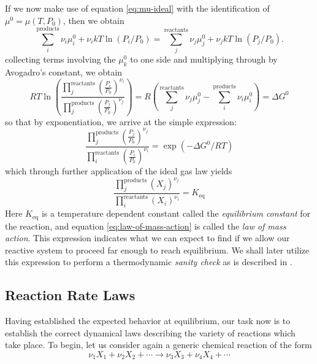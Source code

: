 If we now make use of equation \ref{eq:mu-ideal} with the identification of $\mu^0 = \mu(T,P_0)$, then we obtain
\begin{equation}
  \sum_{i}^{\text{products}}\nu_i\mu_i^0 + \nu_i kT\ln(P_i/P_0) = \sum_{j}^{\text{reactants}} \nu_j\mu_j^0 + \nu_j kT\ln(P_j/P_0).
\end{equation}
collecting terms involving the $\mu^0_k$ to one side and multiplying through by Avogadro's constant, we obtain
\begin{equation}
  RT\ln\left(\frac{\prod\limits_j^{\text{reactants}}\left(\frac{P_i}{P_0}\right)^{\nu_i}}{\prod\limits_j^{\text{products}}\left(\frac{P_j}{P_0}\right)^{\nu_j}}\right) = R\left(\sum_j^{\text{reactants}}\nu_j\mu_j^0 -  \sum_i^{\text{products}} \nu_i\mu_i^0\right) = \Delta G^0
\end{equation}
so that by exponentiation, we arrive at the simple expression:
\begin{equation}
  \frac{\prod\limits_j^{\text{products}}\left(\frac{P_j}{P_0}\right)^{\nu_j}}{\prod\limits_i^{\text{reactants}}\left(\frac{P_i}{P_0}\right)^{\nu_i}} = \exp(-\Delta G^0/RT)
\end{equation}
which through further application of the ideal gas law yields
\begin{equation}
  \label{eq:law-of-mass-action}
  \boxed{\frac{\prod\limits_j^{\text{products}}\left(X_j\right)^{\nu_j}}{\prod\limits_i^{\text{reactants}}\left(X_i\right)^{\nu_i}} = K_{\text{eq}}}
\end{equation}
Here $K_{\text{eq}}$ is a temperature dependent constant called the \textit{equilibrium constant} for the reaction, and equation \ref{eq:law-of-mass-action} is called the \textit{law of mass action}. This expression indicates what we can expect to find if we allow our reactive system to proceed far enough to reach equilibrium. We shall later utilize this expression to perform a thermodynamic \textit{sanity check} as is described in \cite{boldi-thesis}. 


\subsection{Reaction Rate Laws}

Having established the expected behavior at equilibrium, our task now is to establish the correct dynamical laws describing the variety of reactions which take place. To begin, let us consider again a generic chemical reaction of the form
\begin{equation}
  \nu_{1}X_1 + \nu_{2}X_2 + \cdots \longrightarrow \nu_{3}X_3 + \nu_{4}X_4 + \cdots
\end{equation}


